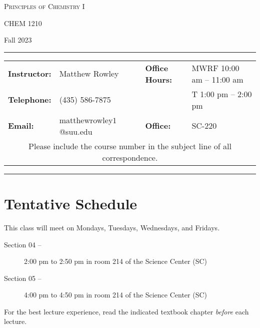 \documentclass[12pt, letterpaper]{article}
\begin{document}
\begin{center}
	{\Large \textsc{Principles of Chemistry I}}
	
	CHEM 1210
\end{center}
\begin{center}
	{\large Fall 2023}
\end{center}
\begin{center}
	\rule{0.99\textwidth}{0.4pt}
	\begin{tabular}{llcll}
		\textbf{Instructor:} & Matthew Rowley           &  & \textbf{Office Hours:} & MWRF 10:00 am -- 11:00 am \\
		\textbf{Telephone:}  & (435) 586-7875           &  &                        & T 1:00 pm -- 2:00 pm    \\
		\textbf{Email:}      & matthewrowley$1$@suu.edu &  & \textbf{Office:}       & SC-220                   \\
		\multicolumn{5}{c}{Please include the course number in the subject line of all correspondence.}
	\end{tabular}
	\rule{0.99\textwidth}{0.4pt}
\end{center}


\section*{Tentative Schedule}
This class will meet on Mondays, Tuesdays, Wednesdays, and Fridays.
\begin{description}
	\item[Section 04 --] 2:00 pm to 2:50 pm in room 214 of the Science Center (SC)
	\item[Section 05 --] 4:00 pm to 4:50 pm in room 214 of the Science Center (SC)
\end{description}

\noindent For the best lecture experience, read the indicated textbook chapter \emph{before} each lecture.

~
\end{document}
